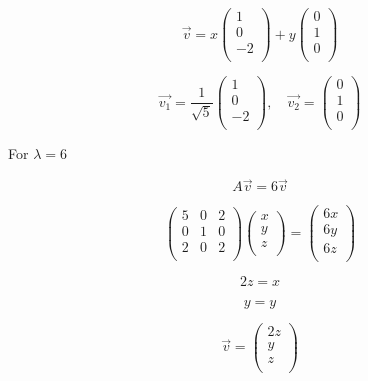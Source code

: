 \documentclass[12pt]{article}
\begin{document}
\[
    \vec{v} = x \begin{pmatrix}
        1  \\
        0  \\
        -2 \\
    \end{pmatrix} +
    y \begin{pmatrix}
        0 \\
        1 \\
        0 \\
    \end{pmatrix}
\]

\[
    \vec{v_1} = \frac{1}{\sqrt{5}} \begin{pmatrix}
        1  \\
        0  \\
        -2 \\
    \end{pmatrix},\quad \vec{v_2} = \begin{pmatrix}
        0 \\
        1 \\
        0 \\
    \end{pmatrix}
\]

For \(\lambda = 6\)

\[
    A\vec{v} = 6\vec{v}
\]

\[
    \begin{pmatrix}
        5 & 0 & 2 \\
        0 & 1 & 0 \\
        2 & 0 & 2 \\
    \end{pmatrix} \begin{pmatrix}
        x \\
        y \\
        z \\
    \end{pmatrix} = \begin{pmatrix}
        6x \\
        6y \\
        6z \\
    \end{pmatrix}
\]

\[
    2z = x
\]

\[
    y = y
\]

\[
    \vec{v} = \begin{pmatrix}
        2z \\
        y  \\
        z  \\
    \end{pmatrix}
\]
\end{document}

